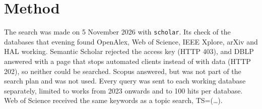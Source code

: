 \section{Method}
\label{sec:ai-rq1-method}


The search was made on 5 November 2026 with \texttt{scholar}.
Its check of the databases that evening found OpenAlex, Web of Science, IEEE
Xplore, arXiv and HAL working.
Semantic Scholar rejected the access key (HTTP 403), and DBLP answered with a
page that stops automated clients instead of with data (HTTP 202), so neither
could be searched.
Scopus answered, but was not part of the search plan and was not used.
Every query was sent to each working database separately, limited to works from
2023 onwards and to 100 hits per database.
Web of Science received the same keywords as a topic search, TS=(\dots).

